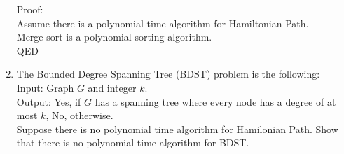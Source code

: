 \documentclass[12pt]{article}
\begin{document}
\begin{enumerate}
    Proof:\\
    Assume there is a polynomial time algorithm for Hamiltonian Path.\\
    Merge sort is a polynomial sorting algorithm.\\
    QED

\item The Bounded Degree Spanning Tree (BDST) problem is the following:\\
    Input: Graph $G$ and integer $k$.\\
    Output: Yes, if $G$ has a spanning tree where every node has a degree of at
    most $k$, No, otherwise.\\
    Suppose there is no polynomial time algorithm for Hamilonian Path. Show that
    there is no polynomial time algorithm for BDST.

\end{enumerate}
\end{document}
